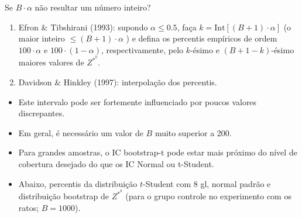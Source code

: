 \documentclass[
  letterpaper,
  DIV=11,
  numbers=noendperiod]{scrreprt}
\begin{document}
\begin{tcolorbox}[enhanced jigsaw, left=2mm, toprule=.15mm, opacityback=0, title=\textcolor{quarto-callout-important-color}{\faExclamation}\hspace{0.5em}{Importante}, leftrule=.75mm, breakable, colbacktitle=quarto-callout-important-color!10!white, coltitle=black, rightrule=.15mm, bottomtitle=1mm, toptitle=1mm, colframe=quarto-callout-important-color-frame, colback=white, opacitybacktitle=0.6, bottomrule=.15mm, arc=.35mm, titlerule=0mm]

Se \(B\cdot\alpha\) não resultar um número inteiro?

\begin{enumerate}
\def\labelenumi{\arabic{enumi}.}
\item
  Efron \(\&\) Tibshirani (1993): supondo \(\alpha \leq 0.5\), faça
  \(k=\mbox{Int}[(B+1)\cdot\alpha]\) (o maior inteiro
  \(\leq (B+1)\cdot\alpha\) ) e defina os percentis empíricos de ordem
  \(100\cdot\alpha\) e \(100\cdot(1-\alpha)\), respectivamente, pelo
  \(k\)-ésimo e \((B+1-k)\)-ésimo maiores valores de \(Z^{*^b}\).
\item
  Davidson \(\&\) Hinkley (1997): interpolação dos percentis.
\end{enumerate}

\end{tcolorbox}

\begin{tcolorbox}[enhanced jigsaw, left=2mm, toprule=.15mm, opacityback=0, title=\textcolor{quarto-callout-note-color}{\faInfo}\hspace{0.5em}{Considerações}, leftrule=.75mm, breakable, colbacktitle=quarto-callout-note-color!10!white, coltitle=black, rightrule=.15mm, bottomtitle=1mm, toptitle=1mm, colframe=quarto-callout-note-color-frame, colback=white, opacitybacktitle=0.6, bottomrule=.15mm, arc=.35mm, titlerule=0mm]

\begin{itemize}
\item
  Este intervalo pode ser fortemente influenciado por poucos valores
  discrepantes.
\item
  Em geral, é necessário um valor de \(B\) muito superior a 200.
\item
  Para grandes amostras, o IC bootstrap-t pode estar mais próximo do
  nível de cobertura desejado do que os IC Normal ou t-Student.
\item
  Abaixo, percentis da distribuição \(t\)-Student com 8 gl, normal
  padrão e distribuição bootstrap de \(Z^{*^b}\) (para o grupo controle
  no experimento com os ratos; \(B=1000\)).
\end{itemize}

\end{tcolorbox}
\end{document}
